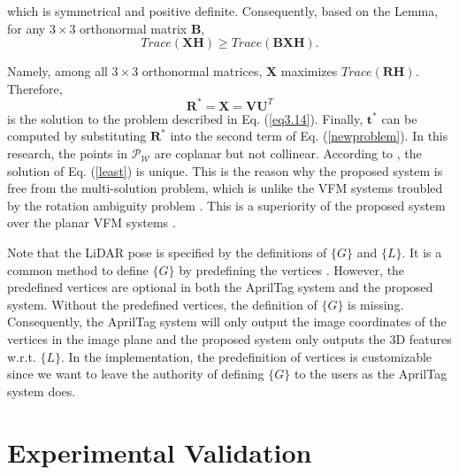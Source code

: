 which is symmetrical and positive definite. Consequently, based on the
Lemma, for any $3\times3$ orthonormal matrix $\mathbf{B}$,
\begin{equation}
Trace\left(\mathbf{X}\mathbf{H} \right) \geq Trace\left(\mathbf{B}\mathbf{X}\mathbf{H} \right).
\end{equation}\par
Namely, among all $3\times3$ orthonormal matrices, $\mathbf{X}$ maximizes $Trace\left( \mathbf{R}\mathbf{H}\right)$. Therefore,
\begin{equation}
\mathbf{R}^{*} = \mathbf{X} = \mathbf{V}\mathbf{U}^{T}
\end{equation}
is the solution to the problem described in Eq. (\ref{eq3.14}). Finally, $\mathbf{t}^{*}$ can be computed by substituting $\mathbf{R}^{*}$ into the second term of Eq. (\ref{newproblem}). In this research, the points in $\mathcal{{P}_{W}}$ are coplanar but not collinear. According to \cite{icp}, the solution of Eq. (\ref{least}) is unique. This is the reason why the proposed system is free from the multi-solution problem, which is unlike the VFM systems troubled by the rotation ambiguity problem \cite{munoz2019,ippe,yibo}. This is a superiority of the proposed system over the planar VFM systems \cite{ap3,aruco}.
\par
Note that the LiDAR pose is specified by the definitions of $\{G\}$ and $\{L\}$. It is a common method to define $\{G\}$ by predefining the vertices \cite{ap3}. However, the predefined vertices are optional in both the AprilTag system \cite{ap3} and the proposed system. Without the predefined vertices, the definition of  $\{G\}$ is missing. Consequently, the AprilTag system \cite{ap3} will only output the image coordinates of the vertices in the image plane and the proposed system only outputs the 3D features w.r.t. $\{L\}$. In the implementation, the predefinition of vertices is customizable since we want to leave the authority of defining $\{G\}$ to the users as the AprilTag system \cite{ap3} does.

\section{Experimental Validation} \label{3.4}

